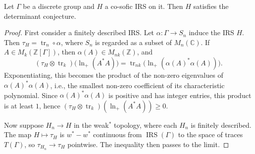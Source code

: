 \documentclass[10pt,a4paper]{amsart}
\DeclareMathOperator{\tr}{tr}
\newcommand{\IRS}{\operatorname{IRS}}
\begin{document}
\begin{lemma}\label{lem:2.13}
    Let $\Gamma$ be a discrete group and $H$ a co-sofic IRS on it.  
    Then $H$ satisfies the determinant conjecture.
\end{lemma}

\begin{proof}
    First consider a finitely described IRS.  
    Let $\alpha \colon \Gamma \to S_n$ induce the IRS $H$.  
    Then $\tau_H = \tr_n \circ \alpha$, where $S_n$ is regarded as a subset of $M_n(\mathbb{C})$.  
    If $A \in M_k(\mathbb{Z}[\Gamma])$, then $\alpha(A) \in M_{nk}(\mathbb{Z})$, and
    \[
        (\tau_H \otimes \tr_k)\big(\ln_+(A^*A)\big)
        = \tr_{nk}\big(\ln_+(\alpha(A)^*\alpha(A))\big).
    \]
    Exponentiating, this becomes the product of the non-zero eigenvalues of $\alpha(A)^*\alpha(A)$, i.e., the smallest non-zero coefficient of its characteristic polynomial.  
    Since $\alpha(A)^*\alpha(A)$ is positive and has integer entries, this product is at least $1$, hence $(\tau_H \otimes \tr_k)(\ln_+(A^*A)) \geq 0$.

    Now suppose $H_n \to H$ in the weak$^*$ topology, where each $H_n$ is finitely described.  
    The map $H \mapsto \tau_H$ is $w^*\!-\!w^*$ continuous from $\IRS(\Gamma)$ to the space of traces $T(\Gamma)$, so $\tau_{H_n} \to \tau_H$ pointwise.  
    The inequality then passes to the limit.
\end{proof}
\end{document}
